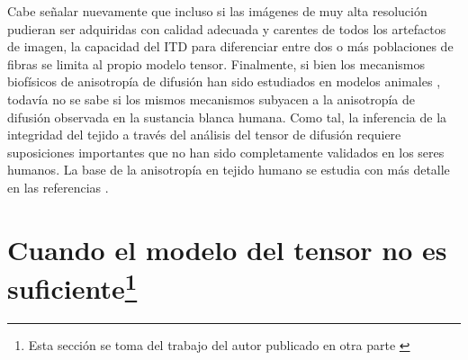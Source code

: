 \documentclass[12pt,a5,twoside]{book}
\begin{document}
Cabe señalar nuevamente que incluso si las imágenes de muy alta resolución pudieran ser adquiridas con calidad adecuada y carentes de todos los artefactos de imagen, la capacidad del ITD para diferenciar entre dos o más poblaciones de fibras se limita al propio modelo tensor. Finalmente, si bien los mecanismos biofísicos de anisotropía de difusión han sido estudiados en modelos animales \citep{Beaulieu2002}, todavía no se sabe si los mismos mecanismos subyacen a la anisotropía de difusión observada en la sustancia blanca humana. Como tal, la inferencia de la integridad del tejido a través del análisis del tensor de difusión requiere suposiciones importantes que no han sido completamente validados en los seres humanos. La base de la anisotropía en tejido humano se estudia con más detalle en las referencias \citep{Beaulieu2002,117,118}.

\section{Cuando el modelo del tensor no es suficiente\footnote{Esta sección se toma del trabajo del autor publicado en otra parte \citep{118}}}
\end{document}
